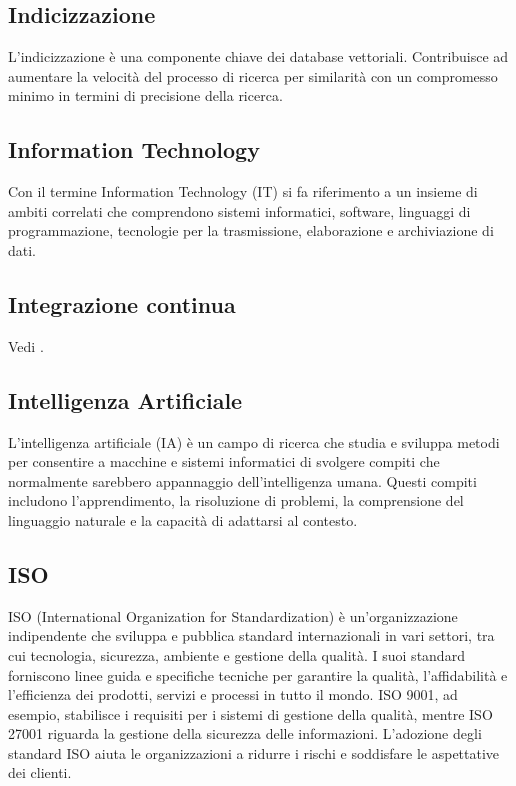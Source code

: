 \vspace{2em}
\subsection*{Indicizzazione}
\par L'indicizzazione è una componente chiave dei database vettoriali. Contribuisce ad aumentare la velocità del processo di ricerca per similarità con un compromesso minimo in termini di precisione della ricerca.

\vspace{2em}
\subsection*{Information Technology}
\par Con il termine Information Technology (IT) si fa riferimento a un insieme di ambiti correlati che comprendono sistemi informatici, software, linguaggi di programmazione, tecnologie per la trasmissione, elaborazione e archiviazione di dati.

\vspace{2em}
\subsection*{Integrazione continua}
\par Vedi .

\vspace{2em}
\subsection*{Intelligenza Artificiale}
\par L'intelligenza artificiale (IA) è un campo di ricerca che studia e sviluppa metodi per consentire a macchine e sistemi informatici di svolgere compiti che normalmente sarebbero appannaggio dell'intelligenza umana. Questi compiti includono l'apprendimento, la risoluzione di problemi, la comprensione del linguaggio naturale e la capacità di adattarsi al contesto.

\vspace{2em}
\subsection*{ISO}
\par ISO (International Organization for Standardization) è un'organizzazione indipendente che sviluppa e pubblica standard internazionali in vari settori, tra cui tecnologia, sicurezza, ambiente e gestione della qualità. I suoi standard forniscono linee guida e specifiche tecniche per garantire la qualità, l'affidabilità e l'efficienza dei prodotti, servizi e processi in tutto il mondo. ISO 9001, ad esempio, stabilisce i requisiti per i sistemi di gestione della qualità, mentre ISO 27001 riguarda la gestione della sicurezza delle informazioni. L'adozione degli standard ISO aiuta le organizzazioni a ridurre i rischi e soddisfare le aspettative dei clienti.

